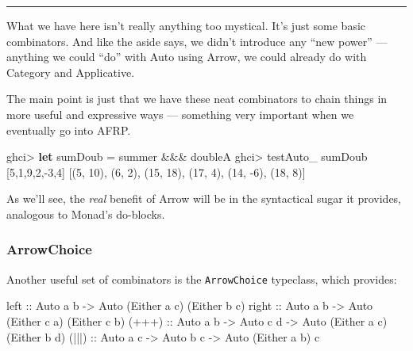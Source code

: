 \documentclass[]{article}
\newenvironment{Shaded}{}{}
\newcommand{\DataTypeTok}[1]{\textcolor[rgb]{0.56,0.13,0.00}{#1}}
\newcommand{\DecValTok}[1]{\textcolor[rgb]{0.25,0.63,0.44}{#1}}
\newcommand{\FunctionTok}[1]{\textcolor[rgb]{0.02,0.16,0.49}{#1}}
\newcommand{\KeywordTok}[1]{\textcolor[rgb]{0.00,0.44,0.13}{\textbf{#1}}}
\newcommand{\NormalTok}[1]{#1}
\newcommand{\OtherTok}[1]{\textcolor[rgb]{0.00,0.44,0.13}{#1}}
\begin{document}
\begin{center}\rule{0.5\linewidth}{\linethickness}\end{center}

What we have here isn't really anything too mystical. It's just some basic
combinators. And like the aside says, we didn't introduce any ``new power'' ---
anything we could ``do'' with Auto using Arrow, we could already do with
Category and Applicative.

The main point is just that we have these neat combinators to chain things in
more useful and expressive ways --- something very important when we eventually
go into AFRP.

\begin{Shaded}
\begin{Highlighting}[]
\NormalTok{ghci}\FunctionTok{>} \KeywordTok{let}\NormalTok{ sumDoub }\FunctionTok{=}\NormalTok{ summer }\FunctionTok{&&&}\NormalTok{ doubleA}
\NormalTok{ghci}\FunctionTok{>}\NormalTok{ testAuto_ sumDoub [}\DecValTok{5}\NormalTok{,}\DecValTok{1}\NormalTok{,}\DecValTok{9}\NormalTok{,}\DecValTok{2}\NormalTok{,}\FunctionTok{-}\DecValTok{3}\NormalTok{,}\DecValTok{4}\NormalTok{]}
\NormalTok{[(}\DecValTok{5}\NormalTok{, }\DecValTok{10}\NormalTok{), (}\DecValTok{6}\NormalTok{, }\DecValTok{2}\NormalTok{), (}\DecValTok{15}\NormalTok{, }\DecValTok{18}\NormalTok{), (}\DecValTok{17}\NormalTok{, }\DecValTok{4}\NormalTok{), (}\DecValTok{14}\NormalTok{, }\FunctionTok{-}\DecValTok{6}\NormalTok{), (}\DecValTok{18}\NormalTok{, }\DecValTok{8}\NormalTok{)]}
\end{Highlighting}
\end{Shaded}

As we'll see, the \emph{real} benefit of Arrow will be in the syntactical sugar
it provides, analogous to Monad's do-blocks.

\hypertarget{arrowchoice}{%
\subsubsection{ArrowChoice}\label{arrowchoice}}

Another useful set of combinators is the \texttt{ArrowChoice} typeclass, which
provides:

\begin{Shaded}
\begin{Highlighting}[]
\OtherTok{left  ::} \DataTypeTok{Auto}\NormalTok{ a b }\OtherTok{->} \DataTypeTok{Auto}\NormalTok{ (}\DataTypeTok{Either}\NormalTok{ a c) (}\DataTypeTok{Either}\NormalTok{ b c)}
\OtherTok{right ::} \DataTypeTok{Auto}\NormalTok{ a b }\OtherTok{->} \DataTypeTok{Auto}\NormalTok{ (}\DataTypeTok{Either}\NormalTok{ c a) (}\DataTypeTok{Either}\NormalTok{ c b)}
\OtherTok{(+++) ::} \DataTypeTok{Auto}\NormalTok{ a b }\OtherTok{->} \DataTypeTok{Auto}\NormalTok{ c d }\OtherTok{->} \DataTypeTok{Auto}\NormalTok{ (}\DataTypeTok{Either}\NormalTok{ a c) (}\DataTypeTok{Either}\NormalTok{ b d)}
\OtherTok{(|||) ::} \DataTypeTok{Auto}\NormalTok{ a c }\OtherTok{->} \DataTypeTok{Auto}\NormalTok{ b c }\OtherTok{->} \DataTypeTok{Auto}\NormalTok{ (}\DataTypeTok{Either}\NormalTok{ a b) c}
\end{Highlighting}
\end{Shaded}
\end{document}

